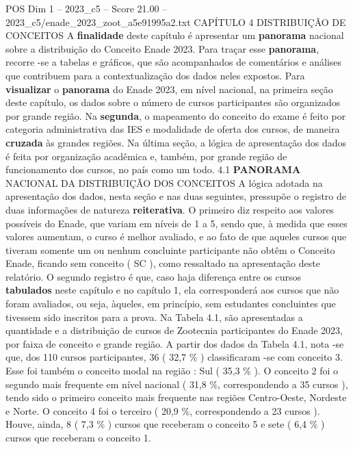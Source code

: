 \begin{textsample}{POS Dim 1 – 2023\_c5 – Score 21.00 – 2023\_c5/enade\_2023\_zoot\_a5e91995a2.txt}  \label{ex:f1_pos_019}
CAPÍTULO 4 DISTRIBUIÇÃO DE CONCEITOS A \textbf{finalidade} deste capítulo é apresentar um \textbf{panorama} nacional sobre a distribuição do Conceito Enade 2023.
Para traçar esse \textbf{panorama}, recorre -se a tabelas e gráficos, que são acompanhados de comentários e análises que contribuem para a contextualização dos dados neles expostos.
Para \textbf{visualizar} o \textbf{panorama} do Enade 2023, em nível nacional, na primeira seção deste capítulo, os dados sobre o número de cursos participantes são organizados por grande região.
Na \textbf{segunda}, o mapeamento do conceito do exame é feito por categoria administrativa das IES e modalidade de oferta dos cursos, de maneira \textbf{cruzada} às grandes regiões.
Na última seção, a lógica de apresentação dos dados é feita por organização acadêmica e, também, por grande região de funcionamento dos cursos, no país como um todo. 4.1 \textbf{PANORAMA} NACIONAL DA DISTRIBUIÇÃO DOS CONCEITOS A lógica adotada na apresentação dos dados, nesta seção e nas duas seguintes, pressupõe o registro de duas informações de natureza \textbf{reiterativa}.
O primeiro diz respeito aos valores possíveis do Enade, que variam em níveis de 1 a 5, sendo que, à medida que esses valores aumentam, o curso é melhor avaliado, e ao fato de que aqueles cursos que tiveram somente um ou nenhum concluinte participante não obtêm o Conceito Enade, ficando sem conceito ( SC ), como ressaltado na apresentação deste relatório.
O segundo registro é que, caso haja diferença entre os cursos \textbf{tabulados} neste capítulo e no capítulo 1, ela corresponderá aos cursos que não foram avaliados, ou seja, àqueles, em princípio, sem estudantes concluintes que tivessem sido inscritos para a prova.
Na Tabela 4.1, são apresentadas a quantidade e a distribuição de cursos de Zootecnia participantes do Enade 2023, por faixa de conceito e grande região.
A partir dos dados da Tabela 4.1, nota -se que, dos 110 cursos participantes, 36 ( 32,7 \% ) classificaram -se com conceito 3.
Esse foi também o conceito modal na região : Sul ( 35,3 \% ).
O conceito 2 foi o segundo mais frequente em nível nacional ( 31,8 \%, correspondendo a 35 cursos ), tendo sido o primeiro conceito mais frequente nas regiões Centro-Oeste, Nordeste e Norte.
O conceito 4 foi o terceiro ( 20,9 \%, correspondendo a 23 cursos ).
Houve, ainda, 8 ( 7,3 \% ) cursos que receberam o conceito 5 e sete ( 6,4 \% ) cursos que receberam o conceito 1.

\end{textsample}
